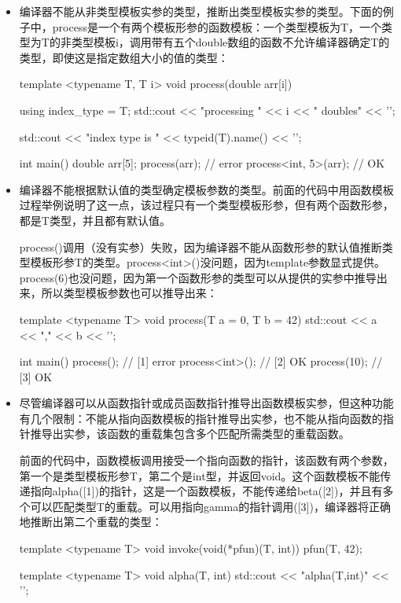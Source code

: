 \begin{itemize}
  \item 编译器不能从非类型模板实参的类型，推断出类型模板实参的类型。下面的例子中，process是一个有两个模板形参的函数模板：一个类型模板为T，一个类型为T的非类型模板i，调用带有五个double数组的函数不允许编译器确定T的类型，即使这是指定数组大小的值的类型：

\begin{cppcode}
template <typename T, T i>
void process(double arr[i])
{
	using index_type = T;
	std::cout << "processing " << i
	          << " doubles" << '\n';
	          
	std::cout << "index type is "
              << typeid(T).name() << '\n';
}

int main()
{
	double arr[5]{};
	process(arr); // error
	process<int, 5>(arr); // OK
}
\end{cppcode}
  \item 编译器不能根据默认值的类型确定模板参数的类型。前面的代码中用函数模板过程举例说明了这一点，该过程只有一个类型模板形参，但有两个函数形参，都是T类型，并且都有默认值。

process()调用（没有实参）失败，因为编译器不能从函数形参的默认值推断类型模板形参T的类型。process<int>()没问题，因为template参数显式提供。process(6)也没问题，因为第一个函数形参的类型可以从提供的实参中推导出来，所以类型模板参数也可以推导出来：

\begin{cppcode}
template <typename T>
void process(T a = 0, T b = 42)
{
	std::cout << a << "," << b << '\n';
}

int main()
{
	process(); // [1] error
	process<int>(); // [2] OK
	process(10); // [3] OK
}
\end{cppcode}
  \item 尽管编译器可以从函数指针或成员函数指针推导出函数模板实参，但这种功能有几个限制：不能从指向函数模板的指针推导出实参，也不能从指向函数的指针推导出实参，该函数的重载集包含多个匹配所需类型的重载函数。

前面的代码中，函数模板调用接受一个指向函数的指针，该函数有两个参数，第一个是类型模板形参T，第二个是int型，并返回void。这个函数模板不能传递指向alpha([1])的指针，这是一个函数模板，不能传递给beta([2])，并且有多个可以匹配类型T的重载。可以用指向gamma的指针调用([3])，编译器将正确地推断出第二个重载的类型：

\begin{cppcode}
template <typename T>
void invoke(void(*pfun)(T, int))
{
	pfun(T{}, 42);
}

template <typename T>
void alpha(T, int)
{ std::cout << "alpha(T,int)" << '\n'; }


\end{cppcode}
\end{itemize}
